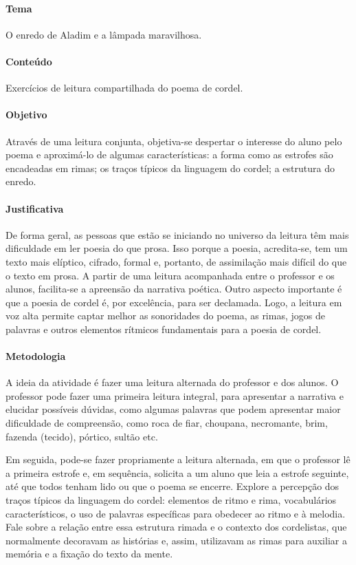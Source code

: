 \documentclass[11pt]{extarticle}
\begin{document}
\paragraph{Tema} O enredo de Aladim e a lâmpada maravilhosa.

\paragraph{Conteúdo} Exercícios de leitura compartilhada do poema de cordel.

\paragraph{Objetivo} Através de uma leitura conjunta, objetiva-se despertar o interesse do aluno pelo poema e aproximá-lo de algumas características: a forma como as estrofes são encadeadas em rimas; os traços típicos da linguagem do cordel; a estrutura do enredo.

\paragraph{Justificativa} De forma geral, as pessoas que estão se iniciando no universo da leitura têm mais dificuldade em ler poesia do que prosa. Isso porque a poesia, acredita-se, tem um texto mais elíptico, cifrado, formal e, portanto, de assimilação mais difícil do que o texto em prosa. A partir de uma leitura acompanhada entre o professor e os alunos, facilita-se a apreensão da narrativa poética. Outro aspecto importante é que a poesia de cordel é, por excelência, para ser declamada. Logo, a leitura em voz alta permite captar melhor as sonoridades do poema, as rimas, jogos de palavras e outros elementos rítmicos fundamentais para a poesia de cordel.

\paragraph{Metodologia} A ideia da atividade é fazer uma leitura alternada do professor e dos alunos. O professor pode fazer uma primeira leitura integral, para apresentar a narrativa e elucidar possíveis dúvidas, como algumas palavras que podem apresentar maior dificuldade de compreensão, como roca de fiar, choupana, necromante, brim, fazenda (tecido), pórtico, sultão etc. 

Em seguida, pode-se fazer propriamente a leitura alternada, em que o professor lê a primeira estrofe e, em sequência, solicita a um aluno que leia a estrofe seguinte, até que todos tenham lido ou que o poema se encerre.
Explore a percepção dos traços típicos da linguagem do cordel: elementos de ritmo e rima, vocabulários característicos, o uso de palavras específicas para obedecer ao ritmo e à melodia. Fale sobre a relação entre essa estrutura rimada e o contexto dos cordelistas, que normalmente decoravam as histórias e, assim, utilizavam as rimas para auxiliar a memória e a fixação do texto da mente.
\end{document}
